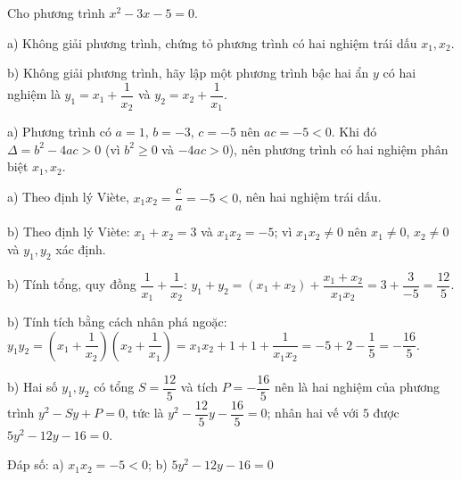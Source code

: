 \begin{problem}[9DS-PT2-016]
Cho phương trình $x^2 - 3x - 5 = 0$.

a) Không giải phương trình, chứng tỏ phương trình có hai nghiệm trái dấu $x_1, x_2$.

b) Không giải phương trình, hãy lập một phương trình bậc hai ẩn $y$ có hai nghiệm là $y_1 = x_1 + \dfrac{1}{x_2}$ và $y_2 = x_2 + \dfrac{1}{x_1}$.

\begin{solution}
a) Phương trình có $a = 1$, $b = -3$, $c = -5$ nên $ac = -5 < 0$. Khi đó $\Delta = b^2 - 4ac > 0$ (vì $b^2 \geq 0$ và $-4ac > 0$), nên phương trình có hai nghiệm phân biệt $x_1, x_2$.

a) Theo định lý Viète, $x_1 x_2 = \dfrac{c}{a} = -5 < 0$, nên hai nghiệm trái dấu.

b) Theo định lý Viète: $x_1 + x_2 = 3$ và $x_1 x_2 = -5$; vì $x_1 x_2 \neq 0$ nên $x_1 \neq 0$, $x_2 \neq 0$ và $y_1, y_2$ xác định.

b) Tính tổng, quy đồng $\dfrac{1}{x_1} + \dfrac{1}{x_2}$: $y_1 + y_2 = (x_1 + x_2) + \dfrac{x_1 + x_2}{x_1 x_2} = 3 + \dfrac{3}{-5} = \dfrac{12}{5}$.

b) Tính tích bằng cách nhân phá ngoặc: $y_1 y_2 = \left(x_1 + \dfrac{1}{x_2}\right)\left(x_2 + \dfrac{1}{x_1}\right) = x_1x_2 + 1 + 1 + \dfrac{1}{x_1x_2} = -5 + 2 - \dfrac{1}{5} = -\dfrac{16}{5}$.

b) Hai số $y_1, y_2$ có tổng $S = \dfrac{12}{5}$ và tích $P = -\dfrac{16}{5}$ nên là hai nghiệm của phương trình $y^2 - Sy + P = 0$, tức là $y^2 - \dfrac{12}{5}y - \dfrac{16}{5} = 0$; nhân hai vế với $5$ được $5y^2 - 12y - 16 = 0$.

Đáp số: a) $\boxed{x_1 x_2 = -5 < 0}$; b) $\boxed{5y^2 - 12y - 16 = 0}$
\end{solution}
\end{problem}

